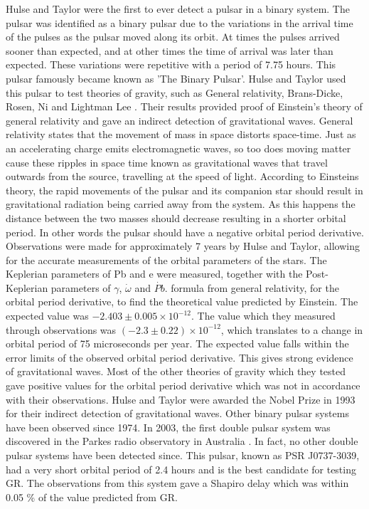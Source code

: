 \documentclass[12pt]{article}
\begin{document}
	Hulse and Taylor were the first to ever detect a pulsar in a binary system. The pulsar was identified as a binary pulsar due to the variations in the arrival time of the pulses as the pulsar moved along its orbit. At times the pulses arrived sooner than expected, and at other times the time of arrival was later than expected. These variations were repetitive with a period of 7.75 hours. This pulsar famously became known as 'The Binary Pulsar'. Hulse and Taylor used this pulsar to test theories of gravity, such as General relativity, Brans-Dicke, Rosen, Ni and Lightman Lee \cite{taylor1982new}. Their results provided proof of Einstein's theory of general relativity and gave an indirect detection of gravitational waves. General relativity states that the movement of mass in space distorts space-time. Just as an accelerating charge emits electromagnetic waves, so too does moving matter cause these ripples in space time known as gravitational waves that travel outwards from the source, travelling at the speed of light. According to Einsteins theory, the rapid movements of the pulsar and its companion star should result in gravitational radiation being carried away from the system. As this happens the distance between the two masses should decrease resulting in a shorter orbital period. In other words the pulsar should have a negative orbital period derivative.\\ 
	
	\noindent Observations were made for approximately 7 years by Hulse and Taylor, allowing for the accurate measurements of the orbital parameters of the stars. The Keplerian parameters of Pb and e were measured, together with the Post-Keplerian parameters of $\gamma$, $\dot{\omega}$ and $\dot{Pb}$.  formula from general relativity, for the orbital period derivative, to find the theoretical value predicted by Einstein. The expected value was $-2.403 \pm 0.005 \times 10^{-12}$. The value which they measured through observations was $(-2.3 \pm 0.22) \times 10^{-12}$, which translates to a change in orbital period of 75 microseconds per year. The expected value falls within the error limits of the observed orbital period derivative. This gives strong evidence of gravitational waves. Most of the other theories of gravity which they tested gave positive values for the orbital period derivative which was not in accordance with their observations. Hulse and Taylor were awarded the Nobel Prize in 1993 for their indirect detection of gravitational waves. Other binary pulsar systems have been observed since 1974. In 2003, the first double pulsar system was discovered in the Parkes radio observatory in Australia \cite{burgay2004highly}. In fact, no other double pulsar systems have been detected since. This pulsar, known as PSR J0737-3039, had a very short orbital period of 2.4 hours and is the best candidate for testing GR. The observations from this system gave a Shapiro delay which was within 0.05 \% of the value predicted from GR.
	
\end{document}
